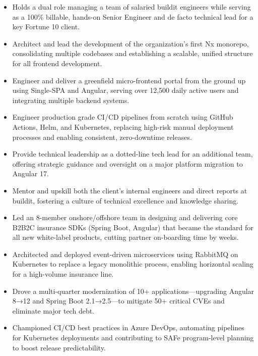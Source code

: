 \begin{itemize}
    \item Holds a dual role managing a team of salaried buildit engineers while serving as a 100\% billable, hands-on Senior Engineer and de facto technical lead for a key Fortune 10 client.
    \item Architect and lead the development of the organization's first Nx monorepo, consolidating multiple codebases and establishing a scalable, unified structure for all frontend development.
    \item Engineer and deliver a greenfield micro-frontend portal from the ground up using Single-SPA and Angular, serving over 12,500 daily active users and integrating multiple backend systems.
    \item Engineer production grade CI/CD pipelines from scratch using GitHub Actions, Helm, and Kubernetes, replacing high-risk manual deployment processes and enabling consistent, zero-downtime releases.
    \item Provide technical leadership as a dotted-line tech lead for an additional team, offering strategic guidance and oversight on a major platform migration to Angular 17.
    \item Mentor and upskill both the client's internal engineers and direct reports at buildit, fostering a culture of technical excellence and knowledge sharing.
\end{itemize}
\vspace{\spacingBetweenJobs}


\begin{itemize}
    \item Led an 8-member onshore/offshore team in designing and delivering core B2B2C insurance SDKs (Spring Boot, Angular) that became the standard for all new white-label products, cutting partner on-boarding time by weeks.
    \item Architected and deployed event-driven microservices using RabbitMQ on Kubernetes to replace a legacy monolithic process, enabling horizontal scaling for a high-volume insurance line.
    \item Drove a multi-quarter modernization of 10+ applications—upgrading Angular 8→12 and Spring Boot 2.1→2.5—to mitigate 50+ critical CVEs and eliminate major tech debt.
    \item Championed CI/CD best practices in Azure DevOps, automating pipelines for Kubernetes deployments and contributing to SAFe program-level planning to boost release predictability.
\end{itemize}
\vspace{\spacingBetweenJobs}

